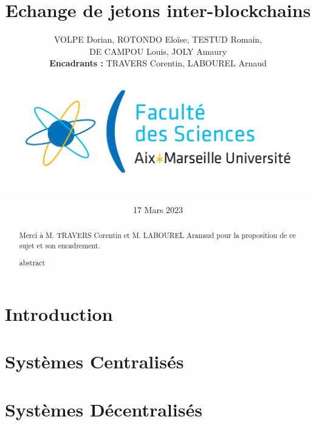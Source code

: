 \documentclass{article}
\newenvironment*{remerciements}{%
  \renewcommand*{\abstractname}{Remerciements}
  \begin{abstract}
}{
  \end{abstract}
}
\begin{document}
\title{Echange de jetons inter-blockchains}
\author{VOLPE Dorian, ROTONDO Eloïse, TESTUD Romain,\\DE CAMPOU Louis, JOLY Amaury  \\ \textbf{Encadrants :} TRAVERS Corentin, LABOUREL Arnaud \\ \includegraphics[scale=0.1]{./img/amu.png}}
\date{17 Mars 2023}

\begin{titlepage}
  \maketitle
\end{titlepage}

\begin{remerciements}
  Merci à M. TRAVERS Corentin et M. LABOUREL Aranaud pour la proposition de ce sujet et son encadrement.
\end{remerciements}
\begin{abstract}
  abstract
\end{abstract}

\newpage

\tableofcontents

\newpage

\section{Introduction}

\section{Systèmes Centralisés}

\section{Systèmes Décentralisés}

\end{document}
